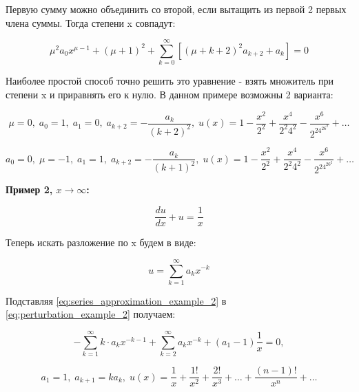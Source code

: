 	Первую сумму можно объединить со второй, если вытащить из первой 2 первых члена суммы. Тогда степени x совпадут:
	
	\begin{equation}
		\mu^2 a_0 x^{\mu-1} + (\mu + 1)^2 + \sum_{k=0}^\infty \left [ (\mu + k + 2)^2 a_{k+2} + a_k \right] = 0
	\end{equation}
	
	Наиболее простой способ точно решить это уравнение - взять множитель при степени x и приравнять его к нулю. В данном примере возможны 2 варианта:
	
	\begin{equation}
		\mu = 0, \;
		a_0 = 1, \;
		a_1 = 0, \;
		a_{k+2} = -\frac{a_k}{(k+2)^2}, \;
		u(x) = 1 - \frac {x^2} {2^2} + \frac{x^4}{2^2 4^2} - \frac {x^6}{2^24^26^2} + \dots
	\end{equation}
	
	\begin{equation}
		a_0 = 0, \;
		\mu = -1, \;
		a_1 = 1, \;
		a_{k+2} = - \frac {a_k} {(k+1)^2}, \;
		u(x) = 1 - \frac {x^2} {2^2} + \frac{x^4}{2^2 4^2} - \frac {x^6}{2^24^26^2} + \dots
	\end{equation}
	
	\textbf{Пример 2, $x \to \infty$:}
	
	\begin{equation}
		\frac {du} {dx} + u = \frac 1 x
		\label{eq:perturbation_example_2}
	\end{equation}
	
	Теперь искать разложение по x будем в виде:
	
	\begin{equation}
		u = \sum_{k=1}^\infty a_k x^{-k}
		\label{eq:series_approximation_example_2}
	\end{equation}
	
	Подставляя \eqref{eq:series_approximation_example_2} в \eqref{eq:perturbation_example_2} получаем:
	
	\begin{equation}
		- \sum_{k=1}^\infty k \cdot a_k x^{-k-1} + \sum_{k=2}^\infty a_k x^{-k} + (a_1 - 1) \frac 1 x = 0,
	\end{equation}
	
	\begin{equation}
		a_1 = 1, \; a_{k+1} = ka_k, \; u(x) = \frac 1 x + \frac {1!} {x^2} + \frac {2!}{x^3} + \dots + \frac {(n-1)!}{x^n} + \dots
	\end{equation}
	
	\newpage
	

